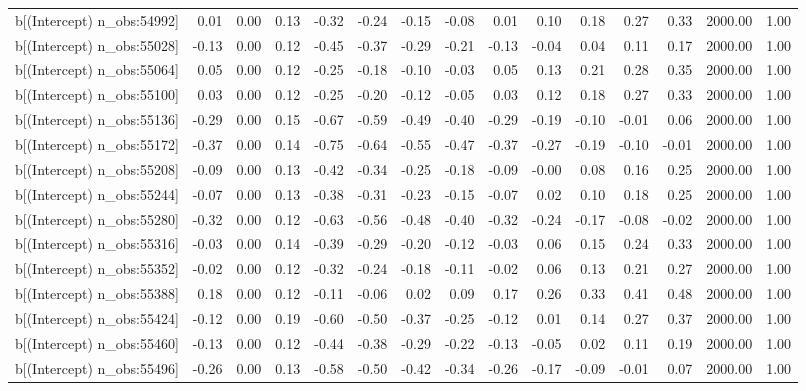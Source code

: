 \begin{table}[ht]
\begin{tabular}{rrrrrrrrrrrrrrr}
  b[(Intercept) n\_obs:54992] & 0.01 & 0.00 & 0.13 & -0.32 & -0.24 & -0.15 & -0.08 & 0.01 & 0.10 & 0.18 & 0.27 & 0.33 & 2000.00 & 1.00 \\ 
  b[(Intercept) n\_obs:55028] & -0.13 & 0.00 & 0.12 & -0.45 & -0.37 & -0.29 & -0.21 & -0.13 & -0.04 & 0.04 & 0.11 & 0.17 & 2000.00 & 1.00 \\ 
  b[(Intercept) n\_obs:55064] & 0.05 & 0.00 & 0.12 & -0.25 & -0.18 & -0.10 & -0.03 & 0.05 & 0.13 & 0.21 & 0.28 & 0.35 & 2000.00 & 1.00 \\ 
  b[(Intercept) n\_obs:55100] & 0.03 & 0.00 & 0.12 & -0.25 & -0.20 & -0.12 & -0.05 & 0.03 & 0.12 & 0.18 & 0.27 & 0.33 & 2000.00 & 1.00 \\ 
  b[(Intercept) n\_obs:55136] & -0.29 & 0.00 & 0.15 & -0.67 & -0.59 & -0.49 & -0.40 & -0.29 & -0.19 & -0.10 & -0.01 & 0.06 & 2000.00 & 1.00 \\ 
  b[(Intercept) n\_obs:55172] & -0.37 & 0.00 & 0.14 & -0.75 & -0.64 & -0.55 & -0.47 & -0.37 & -0.27 & -0.19 & -0.10 & -0.01 & 2000.00 & 1.00 \\ 
  b[(Intercept) n\_obs:55208] & -0.09 & 0.00 & 0.13 & -0.42 & -0.34 & -0.25 & -0.18 & -0.09 & -0.00 & 0.08 & 0.16 & 0.25 & 2000.00 & 1.00 \\ 
  b[(Intercept) n\_obs:55244] & -0.07 & 0.00 & 0.13 & -0.38 & -0.31 & -0.23 & -0.15 & -0.07 & 0.02 & 0.10 & 0.18 & 0.25 & 2000.00 & 1.00 \\ 
  b[(Intercept) n\_obs:55280] & -0.32 & 0.00 & 0.12 & -0.63 & -0.56 & -0.48 & -0.40 & -0.32 & -0.24 & -0.17 & -0.08 & -0.02 & 2000.00 & 1.00 \\ 
  b[(Intercept) n\_obs:55316] & -0.03 & 0.00 & 0.14 & -0.39 & -0.29 & -0.20 & -0.12 & -0.03 & 0.06 & 0.15 & 0.24 & 0.33 & 2000.00 & 1.00 \\ 
  b[(Intercept) n\_obs:55352] & -0.02 & 0.00 & 0.12 & -0.32 & -0.24 & -0.18 & -0.11 & -0.02 & 0.06 & 0.13 & 0.21 & 0.27 & 2000.00 & 1.00 \\ 
  b[(Intercept) n\_obs:55388] & 0.18 & 0.00 & 0.12 & -0.11 & -0.06 & 0.02 & 0.09 & 0.17 & 0.26 & 0.33 & 0.41 & 0.48 & 2000.00 & 1.00 \\ 
  b[(Intercept) n\_obs:55424] & -0.12 & 0.00 & 0.19 & -0.60 & -0.50 & -0.37 & -0.25 & -0.12 & 0.01 & 0.14 & 0.27 & 0.37 & 2000.00 & 1.00 \\ 
  b[(Intercept) n\_obs:55460] & -0.13 & 0.00 & 0.12 & -0.44 & -0.38 & -0.29 & -0.22 & -0.13 & -0.05 & 0.02 & 0.11 & 0.19 & 2000.00 & 1.00 \\ 
  b[(Intercept) n\_obs:55496] & -0.26 & 0.00 & 0.13 & -0.58 & -0.50 & -0.42 & -0.34 & -0.26 & -0.17 & -0.09 & -0.01 & 0.07 & 2000.00 & 1.00 \\ 

\end{tabular}
\end{table}

